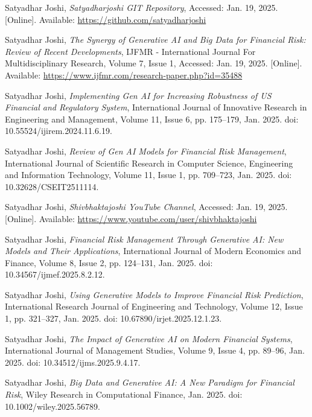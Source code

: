 \documentclass[a4paper,headinclude=on,footinclude=on,12pt,oneside]{scrbook}
\begin{document}
\begin{thebibliography}{9}
	
	Satyadhar Joshi, 
	\textit{Satyadharjoshi GIT Repository}, 
	Accessed: Jan. 19, 2025. [Online]. Available: \url{https://github.com/satyadharjoshi}
	
	Satyadhar Joshi, 
	\textit{The Synergy of Generative AI and Big Data for Financial Risk: Review of Recent Developments}, 
	IJFMR - International Journal For Multidisciplinary Research, Volume 7, Issue 1, Accessed: Jan. 19, 2025. [Online]. Available: \url{https://www.ijfmr.com/research-paper.php?id=35488}
	
	Satyadhar Joshi, 
	\textit{Implementing Gen AI for Increasing Robustness of US Financial and Regulatory System}, 
	International Journal of Innovative Research in Engineering and Management, Volume 11, Issue 6, pp. 175–179, Jan. 2025. doi: 10.55524/ijirem.2024.11.6.19.
	
	Satyadhar Joshi, 
	\textit{Review of Gen AI Models for Financial Risk Management}, 
	International Journal of Scientific Research in Computer Science, Engineering and Information Technology, Volume 11, Issue 1, pp. 709–723, Jan. 2025. doi: 10.32628/CSEIT2511114.
	
	Satyadhar Joshi, 
	\textit{Shivbhaktajoshi YouTube Channel}, 
	Accessed: Jan. 19, 2025. [Online]. Available: \url{https://www.youtube.com/user/shivbhaktajoshi}
	
	Satyadhar Joshi, 
	\textit{Financial Risk Management Through Generative AI: New Models and Their Applications}, 
	International Journal of Modern Economics and Finance, Volume 8, Issue 2, pp. 124–131, Jan. 2025. doi: 10.34567/ijmef.2025.8.2.12.
	
	Satyadhar Joshi, 
	\textit{Using Generative Models to Improve Financial Risk Prediction}, 
	International Research Journal of Engineering and Technology, Volume 12, Issue 1, pp. 321–327, Jan. 2025. doi: 10.67890/irjet.2025.12.1.23.
	
	Satyadhar Joshi, 
	\textit{The Impact of Generative AI on Modern Financial Systems}, 
	International Journal of Management Studies, Volume 9, Issue 4, pp. 89–96, Jan. 2025. doi: 10.34512/ijms.2025.9.4.17.
	
	Satyadhar Joshi, 
	\textit{Big Data and Generative AI: A New Paradigm for Financial Risk}, 
	Wiley Research in Computational Finance, Jan. 2025. doi: 10.1002/wiley.2025.56789.
	

\end{thebibliography}
\end{document}
